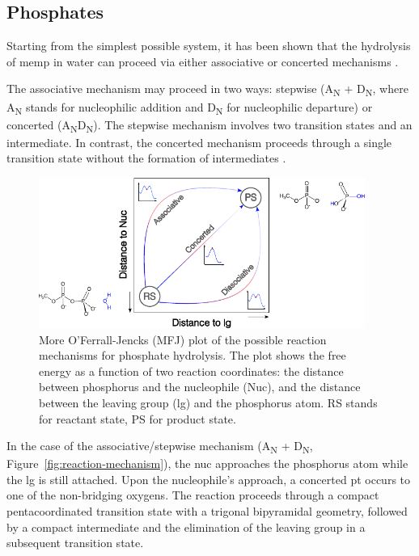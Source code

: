 \subsection{Phosphates} \label{subsec:phosphates}
Starting from the simplest possible system, it has been shown that the hydrolysis of \ac{memp} in water can proceed via either associative or concerted mechanisms \citep{kamerlinWhyNatureReally2013, kamerlinAssociativeDissociativeMechanisms2008, klahnMechanismHydrolysisPhosphate2006, duarteResolvingApparentConflicts2015}.

The associative mechanism may proceed in two ways: stepwise (A\textsubscript{N} + D\textsubscript{N}, where A\textsubscript{N} stands for nucleophilic addition and D\textsubscript{N} for nucleophilic departure) or concerted (A\textsubscript{N}D\textsubscript{N}). The stepwise mechanism involves two transition states and an intermediate. In contrast, the concerted mechanism proceeds through a single transition state without the formation of intermediates \citep{duarteResolvingApparentConflicts2015}.

\begin{figure}[b!]
    \centering
    \includegraphics[width=0.95\textwidth]{Figures/1_Introduction/intro_mfj_plot.pdf}
    \caption{More O'Ferrall-Jencks (MFJ) plot of the possible reaction mechanisms for phosphate hydrolysis. The plot shows the free energy as a function of two reaction coordinates: the distance between phosphorus and the nucleophile (Nuc), and the distance between the leaving group (lg) and the phosphorus atom. RS stands for reactant state, PS for product state.}
    \label{fig:mfj_plot}
\end{figure}

In the case of the associative/stepwise mechanism (A\textsubscript{N} + D\textsubscript{N}, Figure~\ref{fig:reaction-mechanism}), the \ac{nuc} approaches the phosphorus atom while the \ac{lg} is still attached. Upon the nucleophile's approach, a concerted \ac{pt} occurs to one of the non-bridging oxygens. The reaction proceeds through a compact pentacoordinated transition state with a trigonal bipyramidal geometry, followed by a compact intermediate and the elimination of the leaving group in a subsequent transition state.

